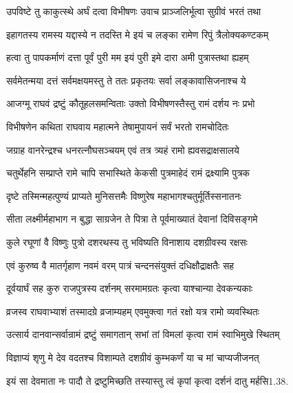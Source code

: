 \twolineshloka
{उपविष्टे तु काकुत्स्थे अर्घं दत्वा विभीषणः}
{उवाच प्राञ्जलिर्भूत्वा सुग्रीवं भरतं तथा}%

\twolineshloka
{इहागतस्य रामस्य यद्दास्ये न तदस्ति मे}
{इयं च लङ्का रामेण रिपुं त्रैलोक्यकण्टकम्}%

\twolineshloka
{हत्वा तु पापकर्माणं दत्ता पूर्वं पुरी मम}
{इयं पुरी इमे दारा अमी पुत्रास्तथा ह्यहम्}%

\twolineshloka
{सर्वमेतन्मया दत्तं सर्वमक्षयमस्तु ते}
{ततः प्रकृतयः सर्वा लङ्कावासिजनाश्च ये}%

\twolineshloka
{आजग्मू राघवं द्रष्टुं कौतूहलसमन्विताः}
{उक्तो विभीषणस्तैस्तु रामं दर्शय नः प्रभो}%

\twolineshloka
{विभीषणेन कथिता राघवाय महात्मने}
{तेषामुपायनं सर्वं भरतो रामचोदितः}%

\twolineshloka
{जग्राह वानरेन्द्रश्च धनरत्नौघसञ्चयम्}
{एवं तत्र त्र्यहं रामो ह्यवसद्राक्षसालये}%

\twolineshloka
{चतुर्थेहनि सम्प्राप्ते रामे चापि सभास्थिते}
{केकसी पुत्रमाहेदं रामं द्रक्ष्यामि पुत्रक}%

\twolineshloka
{दृष्टे तस्मिन्महत्पुण्यं प्राप्यते मुनिसत्तमैः}
{विष्णुरेष महाभागश्चतुर्मूर्तिस्सनातनः}%

\twolineshloka
{सीता लक्ष्मीर्महाभाग न बुद्धा साग्रजेन ते}
{पित्रा ते पूर्वमाख्यातं देवानां दिविसङ्गमे}%

\twolineshloka
{कुले रघूणां वै विष्णुः पुत्रो दशरथस्य तु}
{भविष्यति विनाशाय दशग्रीवस्य रक्षसः}%


\twolineshloka
{एवं कुरुष्व वै मातर्गृहाण नवमं वरम्}
{पात्रं चन्दनसंयुक्तं दधिक्षौद्राक्षतैः सह}%

\twolineshloka
{दूर्वयार्घं सह कुरु राजपुत्रस्य दर्शनम्}
{सरमामग्रतः कृत्वा याश्चान्या देवकन्यकाः}%

\twolineshloka
{व्रजस्व राघवाभ्याशं तस्मादग्रे व्रजाम्यहम्}
{एवमुक्त्वा गतं रक्षो यत्र रामो व्यवस्थितः}%

\twolineshloka
{उत्सार्य दानवान्सर्वान्रामं द्रष्टुं समागतान्}
{सभां तां विमलां कृत्वा रामं स्वाभिमुखे स्थितम्}%


\twolineshloka
{विज्ञाप्यं शृणु मे देव वदतश्च विशाम्पते}
{दशग्रीवं कुम्भकर्णं या च मां चाप्यजीजनत्}%

\twolineshloka
{इयं सा देवमाता नः पादौ ते द्रष्टुमिच्छति}
{तस्यास्तु त्वं कृपां कृत्वा दर्शनं दातु मर्हसि1.38.}%



